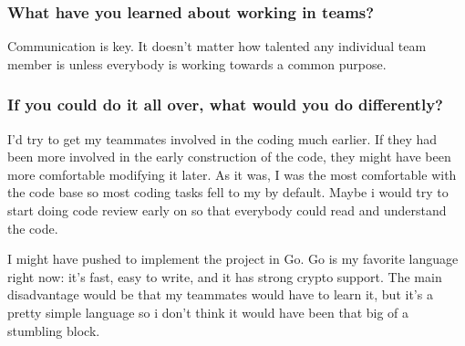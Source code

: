 \subsubsection{What have you learned about working in teams?}

Communication is key.
It doesn't matter how talented any individual team member is unless everybody is working towards a common purpose.

\subsubsection{If you could do it all over, what would you do differently?}

I’d try to get my teammates involved in the coding much earlier.
If they had been more involved in the early construction of the code, they
might have been more comfortable modifying it later.
As it was, I was the most comfortable with the code base so most coding tasks fell to my by default.
Maybe i would try to start doing code review early on so that everybody could read and understand the code.

I might have pushed to implement the project in Go. Go is my favorite language right now: it’s fast, easy to write, and it has strong crypto support. The main disadvantage would be that my teammates would have to learn it, but it’s a pretty simple language so i don’t think it would have been that big of a stumbling block.
